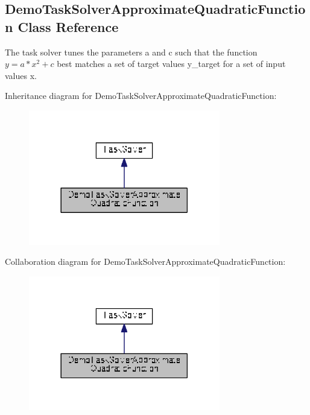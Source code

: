 \hypertarget{classDemoTaskSolverApproximateQuadraticFunction}{\subsection{Demo\+Task\+Solver\+Approximate\+Quadratic\+Function Class Reference}
\label{classDemoTaskSolverApproximateQuadraticFunction}
}


The task solver tunes the parameters a and c such that the function $ y = a*x^2 + c $ best matches a set of target values y\+\_\+target for a set of input values x.  




Inheritance diagram for Demo\+Task\+Solver\+Approximate\+Quadratic\+Function\+:
\nopagebreak
\begin{figure}[H]
\begin{center}
\leavevmode
\includegraphics[width=237pt]{classDemoTaskSolverApproximateQuadraticFunction__inherit__graph}
\end{center}
\end{figure}


Collaboration diagram for Demo\+Task\+Solver\+Approximate\+Quadratic\+Function\+:
\nopagebreak
\begin{figure}[H]
\begin{center}
\leavevmode
\includegraphics[width=237pt]{classDemoTaskSolverApproximateQuadraticFunction__coll__graph}
\end{center}
\end{figure}
